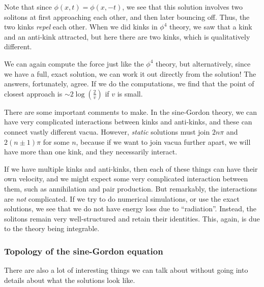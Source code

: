 \documentclass[a4paper]{article}
\begin{document}
\begin{eg}
\begin{center}
  \end{center}

  Note that since $\phi(x, t) = \phi(x, -t)$, we see that this solution involves two solitons at first approaching each other, and then later bouncing off. Thus, the two kinks \emph{repel} each other. When we did kinks in $\phi^4$ theory, we saw that a kink and an anti-kink attracted, but here there are two kinks, which is qualitatively different.

  We can again compute the force just like the $\phi^4$ theory, but alternatively, since we have a full, exact solution, we can work it out directly from the solution! The answers, fortunately, agree. If we do the computations, we find that the point of closest approach is $\sim 2 \log \left(\frac{2}{v}\right)$ if $v$ is small.
\end{eg}

There are some important comments to make. In the sine-Gordon theory, we can have very complicated interactions between kinks and anti-kinks, and these can connect vastly different vacua. However, \emph{static} solutions must join $2n\pi$ and $2(n \pm 1)\pi$ for some $n$, because if we want to join vacua further apart, we will have more than one kink, and they necessarily interact.

If we have multiple kinks and anti-kinks, then each of these things can have their own velocity, and we might expect some very complicated interaction between them, such as annihilation and pair production. But remarkably, the interactions are \emph{not} complicated. If we try to do numerical simulations, or use the exact solutions, we see that we do not have energy loss due to ``radiation''. Instead, the solitons remain very well-structured and retain their identities. This, again, is due to the theory being integrable.

\subsubsection*{Topology of the sine-Gordon equation}
There are also a lot of interesting things we can talk about without going into details about what the solutions look like.
\end{document}
